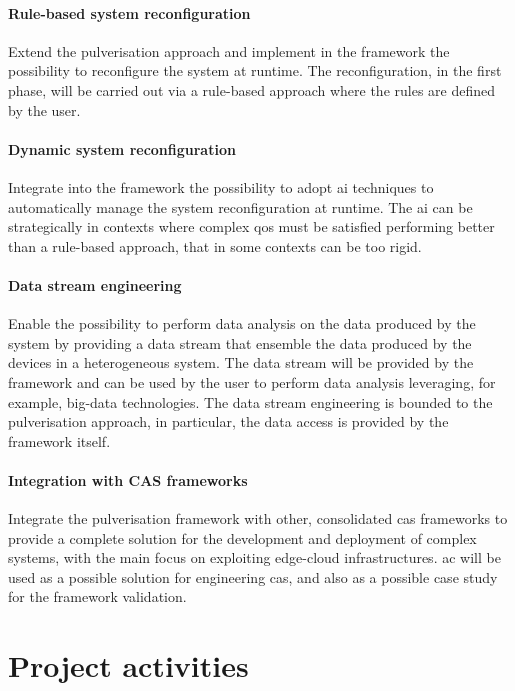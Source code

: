 \documentclass[12pt]{article}
\begin{document}
\paragraph{Rule-based system reconfiguration}
Extend the pulverisation approach and implement in the framework the possibility to
reconfigure the system at runtime.
%
The reconfiguration,
in the first phase,
will be carried out via a rule-based approach where the rules are defined by the user.

\paragraph{Dynamic system reconfiguration}
Integrate into the framework the possibility to adopt \ac{ai} techniques to automatically
manage the system reconfiguration at runtime.
%
The \ac{ai} can be strategically in contexts where complex \ac{qos} must be satisfied
performing better than a rule-based approach, that in some contexts can be too rigid.

\paragraph{Data stream engineering}
Enable the possibility to perform data analysis on the data produced by the system by providing
a data stream that ensemble the data produced by the devices in a heterogeneous system.
%
The data stream will be provided by the framework and can be used by the user to perform
data analysis leveraging,
for example,
big-data technologies.
%
The data stream engineering is bounded to the pulverisation approach,
in particular,
the data access is provided by the framework itself.

\paragraph{Integration with CAS frameworks}
Integrate the pulverisation framework with other, consolidated \ac{cas} frameworks
to provide a complete solution for the development and deployment of complex systems,
with the main focus on exploiting edge-cloud infrastructures.
%
\ac{ac} will be used as a possible solution for engineering \ac{cas},
and also as a possible case study for the framework validation.


\section{Project activities}\label{sec:activities}
\end{document}
